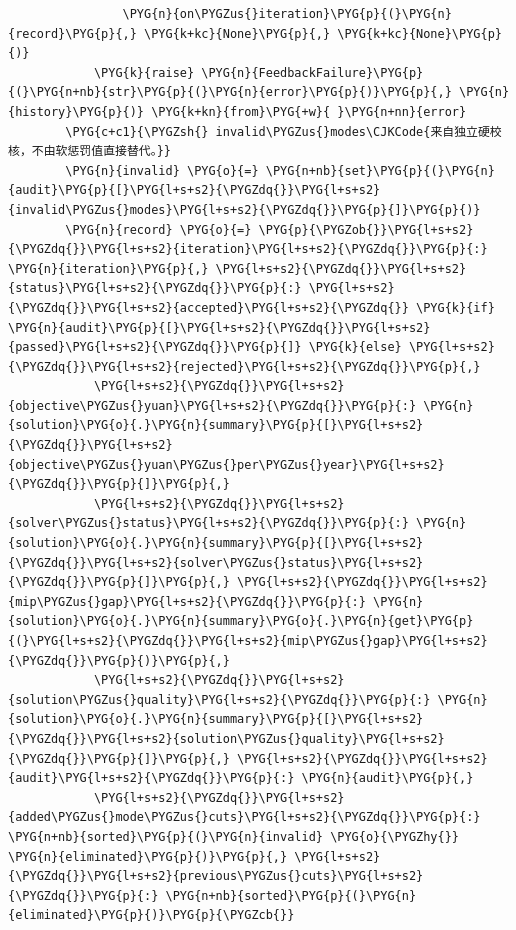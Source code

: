 \begin{Verbatim}
                \PYG{n}{on\PYGZus{}iteration}\PYG{p}{(}\PYG{n}{record}\PYG{p}{,} \PYG{k+kc}{None}\PYG{p}{,} \PYG{k+kc}{None}\PYG{p}{)}
            \PYG{k}{raise} \PYG{n}{FeedbackFailure}\PYG{p}{(}\PYG{n+nb}{str}\PYG{p}{(}\PYG{n}{error}\PYG{p}{)}\PYG{p}{,} \PYG{n}{history}\PYG{p}{)} \PYG{k+kn}{from}\PYG{+w}{ }\PYG{n+nn}{error}
        \PYG{c+c1}{\PYGZsh{} invalid\PYGZus{}modes\CJKCode{来自独立硬校核，不由软惩罚值直接替代。}}
        \PYG{n}{invalid} \PYG{o}{=} \PYG{n+nb}{set}\PYG{p}{(}\PYG{n}{audit}\PYG{p}{[}\PYG{l+s+s2}{\PYGZdq{}}\PYG{l+s+s2}{invalid\PYGZus{}modes}\PYG{l+s+s2}{\PYGZdq{}}\PYG{p}{]}\PYG{p}{)}
        \PYG{n}{record} \PYG{o}{=} \PYG{p}{\PYGZob{}}\PYG{l+s+s2}{\PYGZdq{}}\PYG{l+s+s2}{iteration}\PYG{l+s+s2}{\PYGZdq{}}\PYG{p}{:} \PYG{n}{iteration}\PYG{p}{,} \PYG{l+s+s2}{\PYGZdq{}}\PYG{l+s+s2}{status}\PYG{l+s+s2}{\PYGZdq{}}\PYG{p}{:} \PYG{l+s+s2}{\PYGZdq{}}\PYG{l+s+s2}{accepted}\PYG{l+s+s2}{\PYGZdq{}} \PYG{k}{if} \PYG{n}{audit}\PYG{p}{[}\PYG{l+s+s2}{\PYGZdq{}}\PYG{l+s+s2}{passed}\PYG{l+s+s2}{\PYGZdq{}}\PYG{p}{]} \PYG{k}{else} \PYG{l+s+s2}{\PYGZdq{}}\PYG{l+s+s2}{rejected}\PYG{l+s+s2}{\PYGZdq{}}\PYG{p}{,}
            \PYG{l+s+s2}{\PYGZdq{}}\PYG{l+s+s2}{objective\PYGZus{}yuan}\PYG{l+s+s2}{\PYGZdq{}}\PYG{p}{:} \PYG{n}{solution}\PYG{o}{.}\PYG{n}{summary}\PYG{p}{[}\PYG{l+s+s2}{\PYGZdq{}}\PYG{l+s+s2}{objective\PYGZus{}yuan\PYGZus{}per\PYGZus{}year}\PYG{l+s+s2}{\PYGZdq{}}\PYG{p}{]}\PYG{p}{,}
            \PYG{l+s+s2}{\PYGZdq{}}\PYG{l+s+s2}{solver\PYGZus{}status}\PYG{l+s+s2}{\PYGZdq{}}\PYG{p}{:} \PYG{n}{solution}\PYG{o}{.}\PYG{n}{summary}\PYG{p}{[}\PYG{l+s+s2}{\PYGZdq{}}\PYG{l+s+s2}{solver\PYGZus{}status}\PYG{l+s+s2}{\PYGZdq{}}\PYG{p}{]}\PYG{p}{,} \PYG{l+s+s2}{\PYGZdq{}}\PYG{l+s+s2}{mip\PYGZus{}gap}\PYG{l+s+s2}{\PYGZdq{}}\PYG{p}{:} \PYG{n}{solution}\PYG{o}{.}\PYG{n}{summary}\PYG{o}{.}\PYG{n}{get}\PYG{p}{(}\PYG{l+s+s2}{\PYGZdq{}}\PYG{l+s+s2}{mip\PYGZus{}gap}\PYG{l+s+s2}{\PYGZdq{}}\PYG{p}{)}\PYG{p}{,}
            \PYG{l+s+s2}{\PYGZdq{}}\PYG{l+s+s2}{solution\PYGZus{}quality}\PYG{l+s+s2}{\PYGZdq{}}\PYG{p}{:} \PYG{n}{solution}\PYG{o}{.}\PYG{n}{summary}\PYG{p}{[}\PYG{l+s+s2}{\PYGZdq{}}\PYG{l+s+s2}{solution\PYGZus{}quality}\PYG{l+s+s2}{\PYGZdq{}}\PYG{p}{]}\PYG{p}{,} \PYG{l+s+s2}{\PYGZdq{}}\PYG{l+s+s2}{audit}\PYG{l+s+s2}{\PYGZdq{}}\PYG{p}{:} \PYG{n}{audit}\PYG{p}{,}
            \PYG{l+s+s2}{\PYGZdq{}}\PYG{l+s+s2}{added\PYGZus{}mode\PYGZus{}cuts}\PYG{l+s+s2}{\PYGZdq{}}\PYG{p}{:} \PYG{n+nb}{sorted}\PYG{p}{(}\PYG{n}{invalid} \PYG{o}{\PYGZhy{}} \PYG{n}{eliminated}\PYG{p}{)}\PYG{p}{,} \PYG{l+s+s2}{\PYGZdq{}}\PYG{l+s+s2}{previous\PYGZus{}cuts}\PYG{l+s+s2}{\PYGZdq{}}\PYG{p}{:} \PYG{n+nb}{sorted}\PYG{p}{(}\PYG{n}{eliminated}\PYG{p}{)}\PYG{p}{\PYGZcb{}}

\end{Verbatim}

